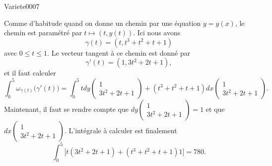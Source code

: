 
\begin{corrige}{Variete0007}

	Comme d'habitude quand on donne un chemin par une équation $y=y(x)$, le chemin est paramétré par $t\mapsto(t,y(t))$. Ici nous avons
	\begin{equation}
		\gamma(t)=(t,t^3+t^2+t+1)
	\end{equation}
	avec $0\leq t\leq 1$. Le vecteur tangent à ce chemin est donné par
	\begin{equation}
		\gamma'(t)=(1,3t^2+2t+1),
	\end{equation}
	et il faut calculer
	\begin{equation}
		\int_0^5\omega_{\gamma(t)}\big( \gamma'(t) \big)=\int_0^5tdy\begin{pmatrix}
			1	\\ 
			3t^2+2t+1	
		\end{pmatrix}+(t^3+t^2+t+1)dx\begin{pmatrix}
			1	\\ 
			3t^2+2t+1	
		\end{pmatrix}.
	\end{equation}
	Maintenant, il faut se rendre compte que $dy\begin{pmatrix}
		1	\\ 
		3t^2+2t+1	
	\end{pmatrix}=1$ et que $dx\begin{pmatrix}
		1	\\ 
		3t^2+2t+1	
	\end{pmatrix}$. L'intégrale à calculer est finalement
	\begin{equation}
		\int_0^5\big[ t(3t^2+2t+1)+(t^3+t^2+t+1)1 \big]=780.
	\end{equation}

\end{corrige}
